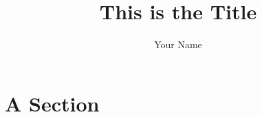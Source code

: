 \documentclass{article}
\title{This is the Title}
\author{Your Name}
\begin{document}
\maketitle


%   

\section{A Section}




% 
% 

% 
\end{document}
